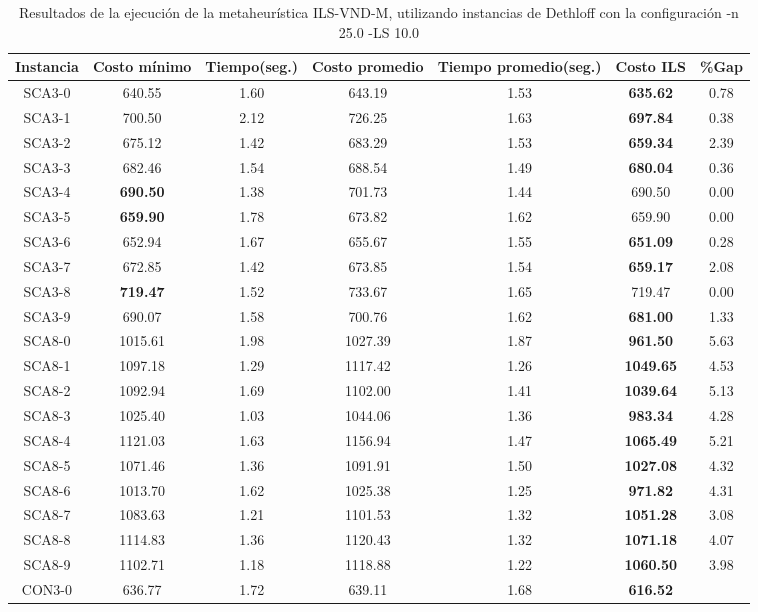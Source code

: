\begin{table}[h]
\caption{Resultados de la ejecución de la metaheurística ILS-VND-M, utilizando instancias de Dethloff con la configuración -n 25.0 -LS 10.0}
\centering
\small
\begin{tabular}{c c c c c c c}
\hline\hline
Instancia & Costo mínimo & Tiempo(seg.) & Costo promedio & Tiempo promedio(seg.) & Costo ILS & \%Gap \\ [0.5ex]
\hline
SCA3-0 & 640.55 & 1.60 & 
643.19 & 1.53 & \bf{635.62} & 
0.78\\SCA3-1 & 700.50 & 2.12 & 
726.25 & 1.63 & \bf{697.84} & 
0.38\\SCA3-2 & 675.12 & 1.42 & 
683.29 & 1.53 & \bf{659.34} & 
2.39\\SCA3-3 & 682.46 & 1.54 & 
688.54 & 1.49 & \bf{680.04} & 
0.36\\SCA3-4 & \bf{690.50} & 1.38 & 
701.73 & 1.44 & 690.50 & 0.00\\
SCA3-5 & \bf{659.90} & 1.78 & 
673.82 & 1.62 & 659.90 & 0.00\\
SCA3-6 & 652.94 & 1.67 & 
655.67 & 1.55 & \bf{651.09} & 
0.28\\SCA3-7 & 672.85 & 1.42 & 
673.85 & 1.54 & \bf{659.17} & 
2.08\\SCA3-8 & \bf{719.47} & 1.52 & 
733.67 & 1.65 & 719.47 & 0.00\\
SCA3-9 & 690.07 & 1.58 & 
700.76 & 1.62 & \bf{681.00} & 
1.33\\SCA8-0 & 1015.61 & 1.98 & 
1027.39 & 1.87 & \bf{961.50} & 
5.63\\SCA8-1 & 1097.18 & 1.29 & 
1117.42 & 1.26 & \bf{1049.65} & 
4.53\\SCA8-2 & 1092.94 & 1.69 & 
1102.00 & 1.41 & \bf{1039.64} & 
5.13\\SCA8-3 & 1025.40 & 1.03 & 
1044.06 & 1.36 & \bf{983.34} & 
4.28\\SCA8-4 & 1121.03 & 1.63 & 
1156.94 & 1.47 & \bf{1065.49} & 
5.21\\SCA8-5 & 1071.46 & 1.36 & 
1091.91 & 1.50 & \bf{1027.08} & 
4.32\\SCA8-6 & 1013.70 & 1.62 & 
1025.38 & 1.25 & \bf{971.82} & 
4.31\\SCA8-7 & 1083.63 & 1.21 & 
1101.53 & 1.32 & \bf{1051.28} & 
3.08\\SCA8-8 & 1114.83 & 1.36 & 
1120.43 & 1.32 & \bf{1071.18} & 
4.07\\SCA8-9 & 1102.71 & 1.18 & 
1118.88 & 1.22 & \bf{1060.50} & 
3.98\\CON3-0 & 636.77 & 1.72 & 
639.11 & 1.68 & \bf{616.52} & 

\end{tabular}
\end{table}

